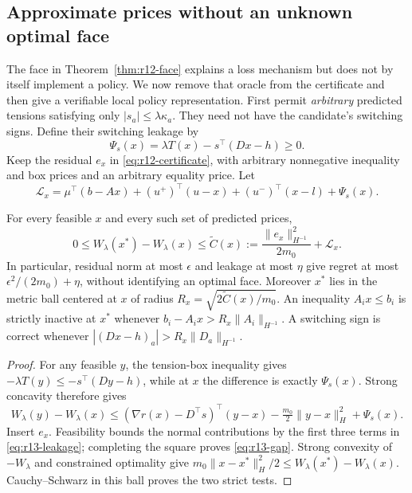\subsection{Approximate prices without an unknown optimal face}\label{sec:r13-leakage}
The face in Theorem~\ref{thm:r12-face} explains a loss mechanism but does not by itself implement a policy. We now remove that oracle from the certificate and then give a verifiable local policy representation. First permit \emph{arbitrary} predicted tensions satisfying only $|s_a|\leq\lambda\kappa_a$. They need not have the candidate's switching signs. Define their switching leakage by
\[
 \Psi_s(x)=\lambda T(x)-s^\top(Dx-h)\geq0.
\]
Keep the residual $e_x$ in \eqref{eq:r12-certificate}, with arbitrary nonnegative inequality and box prices and an arbitrary equality price. Let
\begin{equation}\label{eq:r13-leakage}
 \mathcal L_x=\mu^\top(b-Ax)+(u^+)^\top(u-x)+(u^-)^\top(x-l)+\Psi_s(x).
\end{equation}
\begin{theorem}\label{thm:r13-leakage}
For every feasible $x$ and every such set of predicted prices,
\begin{equation}\label{eq:r13-gap}
 0\leq W_\lambda(x^*)-W_\lambda(x)
 \leq\widetilde C(x):=\frac{\|e_x\|_{H^{-1}}^2}{2m_0}+\mathcal L_x.
\end{equation}
In particular, residual norm at most $\epsilon$ and leakage at most $\eta$ give regret at most $\epsilon^2/(2m_0)+\eta$, without identifying an optimal face. Moreover $x^*$ lies in the metric ball centered at $x$ of radius $R_x=\sqrt{2\widetilde C(x)/m_0}$. An inequality $A_i x\leq b_i$ is strictly inactive at $x^*$ whenever
$b_i-A_i x>R_x\|A_i\|_{H^{-1}}$. A switching sign is correct whenever
$|(Dx-h)_a|>R_x\|D_a\|_{H^{-1}}$.
\end{theorem}
\begin{proof}
For any feasible $y$, the tension-box inequality gives
$-\lambda T(y)\leq-s^\top(Dy-h)$, while at $x$ the difference is exactly $\Psi_s(x)$. Strong concavity therefore gives
\[
 W_\lambda(y)-W_\lambda(x)
 \leq(\nabla r(x)-D^\top s)^\top(y-x)
       -\tfrac{m_0}{2}\|y-x\|_H^2+\Psi_s(x).
\]
Insert $e_x$. Feasibility bounds the normal contributions by the first three terms in \eqref{eq:r13-leakage}; completing the square proves \eqref{eq:r13-gap}. Strong convexity of $-W_\lambda$ and constrained optimality give
$m_0\|x-x^*\|_H^2/2\leq W_\lambda(x^*)-W_\lambda(x)$.
Cauchy--Schwarz in this ball proves the two strict tests.
\end{proof}
